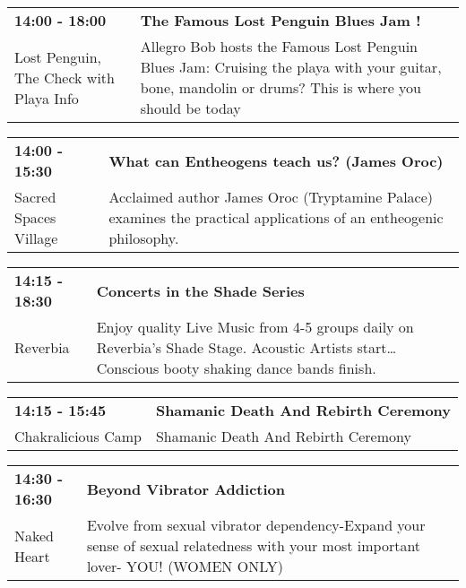 \begin{tabular}{ p{1in} p{2.2in} }
    \textbf{14:00 - 18:00} & \textbf{The Famous Lost Penguin Blues Jam !} \\
    Lost Penguin, The \newline Check with Playa Info & Allegro Bob hosts the Famous Lost Penguin Blues Jam: Cruising the playa with your guitar, bone, mandolin or drums? This is where you should be today \\
    \hline 
\end{tabular}
    
\begin{tabular}{ p{1in} p{2.2in} }
    \textbf{14:00 - 15:30} & \textbf{What can Entheogens teach us? (James Oroc)} \\
    Sacred Spaces Village \newline  & Acclaimed author James Oroc (Tryptamine Palace) examines the practical applications of an entheogenic philosophy. \\
    \hline 
\end{tabular}
    
\begin{tabular}{ p{1in} p{2.2in} }
    \textbf{14:15 - 18:30} & \textbf{Concerts in the Shade Series} \\
    Reverbia \newline  & Enjoy quality Live Music from 4-5 groups daily on Reverbia's Shade Stage.  Acoustic Artists start\ldots Conscious booty shaking dance bands finish. \\
    \hline 
\end{tabular}
    
\begin{tabular}{ p{1in} p{2.2in} }
    \textbf{14:15 - 15:45} & \textbf{Shamanic Death And Rebirth Ceremony} \\
    Chakralicious Camp \newline  & Shamanic Death And Rebirth Ceremony \\
    \hline 
\end{tabular}
    
\begin{tabular}{ p{1in} p{2.2in} }
    \textbf{14:30 - 16:30} & \textbf{Beyond Vibrator Addiction} \\
    Naked Heart \newline  & Evolve from sexual vibrator dependency-Expand your sense of sexual relatedness with your most important lover- YOU! (WOMEN ONLY) \\
    \hline 
\end{tabular}
    
